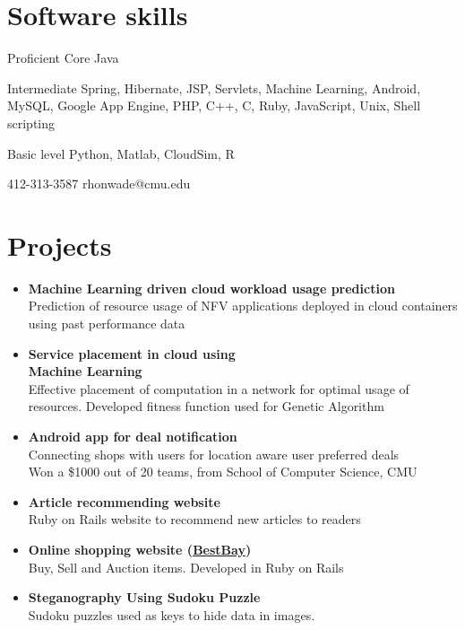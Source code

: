 \documentclass{tccv}
\begin{document}
\vspace{-0.2in}
\section{Software skills}
\begin{factlist}
\item{Proficient}
     {Core Java}       

\item{Intermediate}
     {Spring, Hibernate, JSP, Servlets, Machine Learning, Android, MySQL, Google App Engine, PHP, C++, C, Ruby, JavaScript, Unix, Shell scripting}

\item{Basic level}
     {Python, Matlab, CloudSim, R}
\end{factlist}

    {412-313-3587}
    {rhonwade@cmu.edu}

\section{Projects}

\begin{itemize}

\item\textbf{Machine Learning driven cloud workload usage prediction}\\
      {Prediction of resource usage of NFV applications deployed in cloud containers using past performance data}
\item\textbf{Service placement in cloud using \\Machine Learning}\\
     {Effective placement of computation in a network for optimal usage of resources. Developed fitness function 
used for Genetic Algorithm}

\item\textbf{Android app for deal notification}\\
     {Connecting shops with users for location aware user preferred deals}\\
     Won a \$1000 {} out of 20 teams, from School of Computer Science, CMU

\item\textbf{Article recommending website}\\
     {Ruby on Rails website to recommend new articles to readers}
\item\textbf{Online shopping website (\href{http://rhbestbay.herokuapp.com/}{BestBay})}\\
     {Buy, Sell and Auction items. Developed in Ruby on Rails}
\item\textbf{Steganography Using Sudoku Puzzle}\\
     {Sudoku puzzles used as keys to hide data in images.
     }

\end{itemize}
\end{document}
